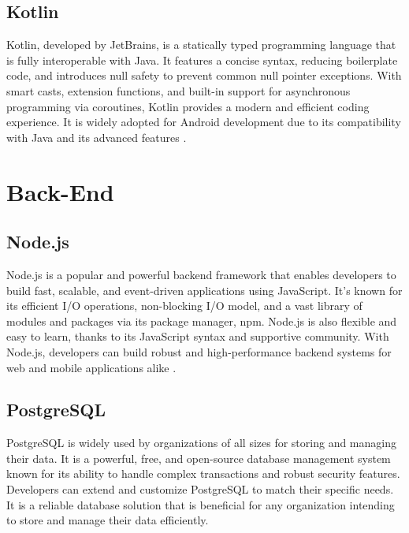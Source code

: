 \subsection{Kotlin}
Kotlin, developed by JetBrains, is a statically typed programming language that is fully interoperable with Java. It features a concise syntax, reducing boilerplate code, and introduces null safety to prevent common null pointer exceptions. With smart casts, extension functions, and built-in support for asynchronous programming via coroutines, Kotlin provides a modern and efficient coding experience. It is widely adopted for Android development due to its compatibility with Java and its advanced features \cite{kotlin2025}.

\section{Back-End}

\subsection{Node.js}
Node.js is a popular and powerful backend framework that enables developers to build fast, scalable, and event-driven applications using JavaScript. It’s known for its efficient I/O operations, non-blocking I/O model, and a vast library of modules and packages via its package manager, npm. Node.js is also flexible and easy to learn, thanks to its JavaScript syntax and supportive community. With Node.js, developers can build robust and high-performance backend systems for web and mobile applications alike \cite{casciaro2020nodejs}.

\subsection{PostgreSQL}
PostgreSQL is widely used by organizations of all sizes for storing and managing their data. It is a powerful, free, and open-source database management system known for its ability to handle complex transactions and robust security features. Developers can extend and customize PostgreSQL to match their specific needs. It is a reliable database solution that is beneficial for any organization intending to store and manage their data efficiently.